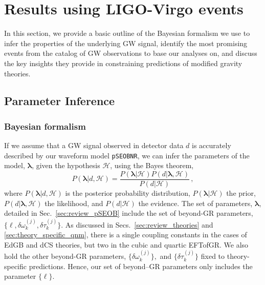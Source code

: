 \documentclass[twocolumn,prd,aps,superscriptaddress,preprintnumbers,tightenlines,showpacs,nofootinbib,eqsecnum,amsfonts,amsmath,longbibliography]{revtex4-1}
\newcommand{\pSEOB}{\texttt{pSEOBNR}}
\newcommand{\hs}[1]{{\textcolor{blue}{{[HS: #1]}} }}
\begin{document}

\section{Results using LIGO-Virgo events}
\label{sec:results}

In this section, we provide a basic outline of the Bayesian formalism we use to
infer the properties of the underlying GW signal, identify the most promising
events from the catalog of GW observations to base our analyses on, and discuss
the key insights they provide in constraining predictions of modified gravity
theories.

\subsection{Parameter Inference}

\subsubsection{Bayesian formalism}
If we assume that a GW signal observed in detector data $d$ is accurately
described by our waveform model \pSEOB{}, we can infer the parameters of the
model, $\bm{\lambda}$, given the hypothesis $\mathcal{H}$, using the Bayes
theorem,
%
\begin{equation}
P(\bm{\lambda} \vert d, \mathcal{H}) =
\frac{P(\bm{\lambda} \vert \mathcal{H}) P(d \vert \bm{\lambda},\mathcal{H})}{P(d \vert \mathcal{H})}\,,
\label{eq:bayes}
\end{equation}
%
where $P(\bm{\lambda} \vert d, \mathcal{H})$ is the posterior probability distribution,
$P(\bm{\lambda} \vert \mathcal{H})$ the prior,
$P(d \vert \bm{\lambda},\mathcal{H})$ the likelihood, and
$P(d \vert \mathcal{H})$ the evidence. The set of parameters, $\bm{\lambda}$, detailed in Sec.~\ref{sec:review_pSEOB}
include the set of beyond-GR parameters, $\{\ell, \delta \omega_k^{(j)}, \delta \tau_k^{(j)}\}$.
%
As discussed in Secs.~\ref{sec:review_theories} and \ref{sec:theory_specific_qnm}, there is a single coupling
constants in the cases of EdGB and dCS theories, but two in the cubic and
quartic EFTofGR. We also hold the other beyond-GR parameters, $\{\delta \omega_k^{(j)}\},$ and $\{\delta \tau_k^{(j)}\}$
fixed to theory-specific predictions. Hence, our set of beyond--GR parameters only includes the parameter $\{\ell \}$.
%
\end{document}
